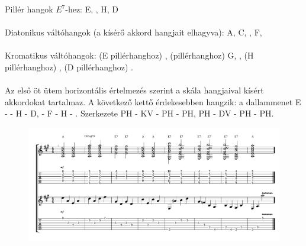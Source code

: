 Pillér hangok $E^7$-hez:
E, \gisz, H, D \\\\
Diatonikus váltóhangok (a kísérő akkord hangjait elhagyva):
A, C, \cisz, F, \fisz \\\\
Kromatikus váltóhangok:
(E pillérhanghoz) \disz,
(\gisz pillérhanghoz) G, \aisz,
(H pillérhanghoz) \aisz,
(D pillérhanghoz) \disz. \\\\
Az első öt ütem horizontális értelmezés szerint a skála hangjaival kísért akkordokat tartalmaz. A következő kettő érdekesebben hangzik: a dallammenet  E - \aisz - H - D, \gisz - F - H - \gisz. Szerkezete PH - KV - PH - PH, PH - DV - PH - PH. 

\begin{figure}[!htbp]
 \advance\leftskip-6mm
 \includegraphics[page=1,scale=0.70]{notes/dallamszerkesztes.pdf}
\end{figure}

